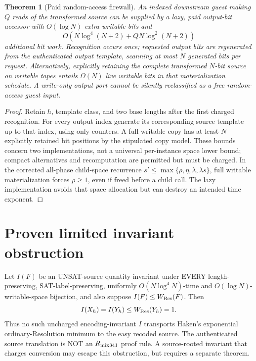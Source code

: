 \documentclass[11pt]{article}
\newtheorem{theorem}{Theorem}
\begin{document}
\begin{theorem}[Paid random-access firewall]
An indexed downstream guest making $Q$ reads of the transformed source can be supplied by a lazy, paid output-bit accessor with $O(\log N)$ extra writable bits and
\[
O(N\log^4(N+2)+QN\log^2(N+2))
\]
additional bit work. Recognition occurs once; requested output bits are regenerated from the authenticated output template, scanning at most $N$ generated bits per request. Alternatively, explicitly retaining the complete transformed $N$-bit source on writable tapes entails $\Omega(N)$ live writable bits in that materialization schedule. A write-only output port cannot be silently reclassified as a free random-access guest input.
\end{theorem}
\begin{proof}
Retain $h$, template class, and two base lengths after the first charged recognition. For every output index generate its corresponding source template up to that index, using only counters. A full writable copy has at least $N$ explicitly retained bit positions by the stipulated copy model. These bounds concern two implementations, not a universal per-instance space lower bound; compact alternatives and recomputation are permitted but must be charged. In the corrected all-phase child-space recurrence $s'\le\max\{\rho,\eta,\lambda,\lambda s\}$, full writable materialization forces $\rho\ge1$, even if freed before a child call. The lazy implementation avoids that space allocation but can destroy an intended time exponent.
\end{proof}

\section*{Proven limited invariant obstruction}
Let $I(F)$ be an UNSAT-source quantity invariant under EVERY length-preserving, SAT-label-preserving, uniformly $O(N\log^4N)$-time and $O(\log N)$-writable-space bijection, and also suppose $I(F)\le W_{\rm Res}(F)$. Then
\[
I(X_h)=I(Y_h)\le W_{\rm Res}(Y_h)=1.
\]
Thus no such uncharged encoding-invariant $I$ transports Haken's exponential ordinary-Resolution minimum to the easy recoded source. The authenticated source translation is NOT an $R_{\rm mix341}$ proof rule. A source-rooted invariant that charges conversion may escape this obstruction, but requires a separate theorem.
\end{document}
